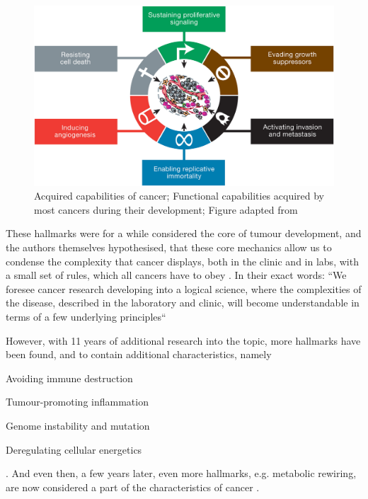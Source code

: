 {\begin{figure}[hbtp]
\centering
\includegraphics[width=.9\linewidth]{Figures/intro/oldHallmarksCancer.jpg}
\caption[Original hallmarks of cancer]{Acquired capabilities of cancer; Functional capabilities acquired by most cancers during their development; Figure adapted from \protect\textcite{Hanahan2000}}\label{fig:oldhallmarks}
\end{figure}



These hallmarks were for a while considered the core of tumour development, and the authors themselves hypothesised, that these core mechanics allow us to condense the complexity that cancer displays, both in the clinic and in labs, with a small set of rules, which all cancers have to obey \cite{Hanahan2000}. In their exact words: ``We foresee cancer research developing into a logical science, where the complexities of the disease, described in the laboratory and clinic, will become understandable in terms of a few underlying principles``

However, with 11 years of additional research into the topic, more hallmarks have been found, and  to contain additional characteristics, namely 
\begin{enumerate*}
\item Avoiding immune destruction
\item Tumour-promoting inflammation
\item Genome instability and mutation
\item Deregulating cellular energetics
\end{enumerate*} \cite{Hanahan2011}. And even then, a few years later, even more hallmarks, e.g. metabolic rewiring, are now considered a part of the characteristics of cancer \cite{Fouad2017}.


}

